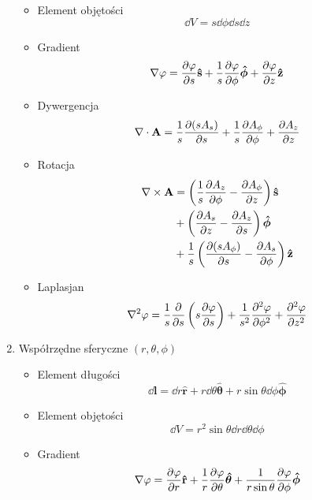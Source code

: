 \documentclass[../main.tex]{subfiles}
\begin{document}
\begin{enumerate}
\begin{itemize}
    \item Element objętości
    \begin{equation*}
        \dd{V}=s\dd{\phi}\dd{s}\dd{z}
    \end{equation*}
        \item Gradient
        \begin{equation*}
            \nabla \varphi =\pdv{\varphi}{s}\mathbf{\hat{s}}+\frac{1}{s}\pdv{\varphi}{\phi}\boldsymbol{\hat{\phi}}+\pdv{\varphi}{z}\mathbf{\hat{z}}
        \end{equation*}
        
        \item Dywergencja
        \begin{equation*}
            \nabla\cdot\mathbf{A}=\frac{1}{s}\pdv{(sA_s)}{s}+\frac{1}{s}\pdv{A_\phi}{\phi}+\pdv{A_z}{z}
        \end{equation*}
        
        \item Rotacja
        \begin{equation*}
        \begin{split}
            \nabla\times\mathbf{A}&=\left(\frac{1}{s}\pdv{A_z}{\phi}-\pdv{A_\phi}{z}\right)\mathbf{\hat{s}}\\
            &+\left(\pdv{A_s}{z}-\pdv{A_z}{s}\right)\boldsymbol{\hat{\phi}}\\
            &+\frac{1}{s}\left(\pdv{(sA_\phi)}{s} -\pdv{A_s}{\phi}\right)\mathbf{\hat{z}}
            \end{split}
        \end{equation*}
        
        \item Laplasjan
        \begin{equation*}
            \nabla^2\varphi =\frac{1}{s}\frac{\partial}{\partial s}\left(s\pdv{\varphi}{s}\right)+\frac{1}{s^2}\pdv[2]{\varphi}{\phi}+\pdv[2]{\varphi}{z}
        \end{equation*}
    \end{itemize}
    \item Współrzędne sferyczne \((r,\theta,\phi)\)
    
    \begin{itemize}
        \item Element długości
        \begin{equation*}
            \dd{\mathbf{l}}=\dd{r}\mathbf{\hat{r}}+r\dd{\theta}\boldsymbol{\hat{\theta}}+r\sin\theta\dd{\phi}\boldsymbol{\hat{\phi}}
        \end{equation*}
        \item Element objętości
        \begin{equation*}
            \dd{V}=r^2\sin\theta \dd{r}\dd{\theta}\dd{\phi}
        \end{equation*}
        \item Gradient
        \begin{equation*}
            \nabla\varphi=\pdv{\varphi}{r}\mathbf{\hat{r}}+\frac{1}{r}\pdv{\varphi}{\theta}\boldsymbol{\hat{\theta}}+\frac{1}{r\sin\theta}\pdv{\varphi}{\phi}\boldsymbol{\hat{\phi}}        
            \end{equation*}
            

\end{itemize}
\end{enumerate}
\end{document}
